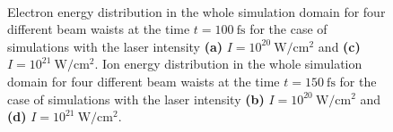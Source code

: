 \begin{figure}[h!]
	\centering
	\hspace{1mm}
	\\[1mm]
	\hspace{1mm}
	\caption{Electron energy distribution in the whole simulation domain for four different beam waists at the time $ t = 100 \ \mathrm{fs} $ for the case of simulations with the laser intensity \textbf{(a)} $ I = 10^{20} \ \mathrm{W/cm^2} $ and \textbf{(c)} $ I = 10^{21} \ \mathrm{W/cm^2} $. Ion energy distribution in the whole simulation domain for four different beam waists at the time $ t = 150 \ \mathrm{fs} $ for the case of simulations with the laser intensity \textbf{(b)} $ I = 10^{20} \ \mathrm{W/cm^2} $ and \textbf{(d)} $ I = 10^{21} \ \mathrm{W/cm^2} $.}
	\label{fig:14}
\end{figure}

